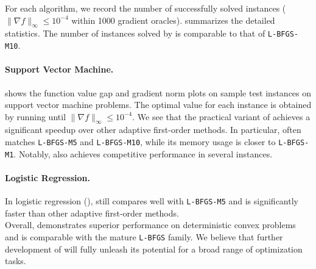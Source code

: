 For each algorithm, we record the number of successfully solved instances ($\|\nabla f\|_\infty \leq 10^{-4}$ within 1000 gradient oracles).  summarizes the detailed statistics. The number of instances solved by {\hdmbest} is comparable to that of \texttt{L-BFGS-M10}.

\paragraph{Support Vector Machine.}  shows the function value gap and gradient norm plots on sample test instances on support vector machine problems. The optimal value for each instance is obtained by running {\bfgs} until $\|\nabla f \|_\infty \leq 10^{-4}$.  We see that the practical variant of {\hdmbest} achieves a significant speedup over other adaptive first-order methods. In particular, {\hdmbest} often matches \texttt{L-BFGS-M5} and \texttt{L-BFGS-M10}, while its memory usage is closer to \texttt{L-BFGS-M1}. Notably, {\adam} also achieves competitive performance in several instances.

\paragraph{Logistic Regression.} In logistic regression (), {\hdmbest} still compares well with \texttt{L-BFGS-M5} and is significantly faster than other adaptive first-order methods.\\

Overall, {\hdmbest} demonstrates superior performance on deterministic convex problems and is comparable with the mature \texttt{L-BFGS} family. We believe that further development of {\hdm} will fully unleash its potential for a broad range of optimization tasks.

